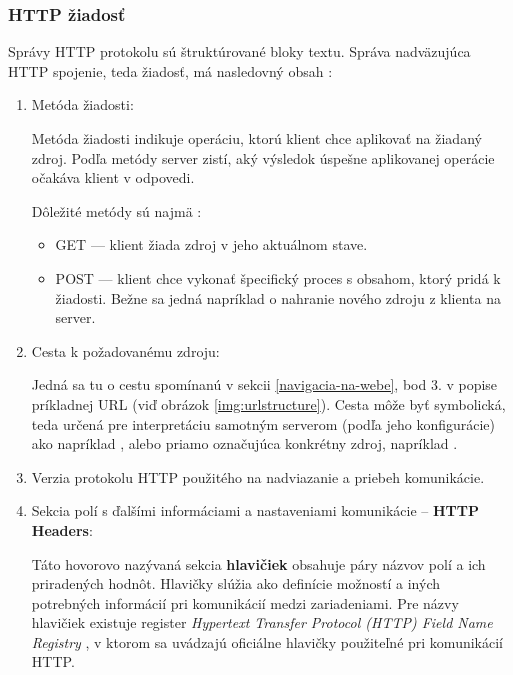 \subsubsection{HTTP žiadosť}

Správy HTTP protokolu sú štruktúrované bloky textu.
Správa nadväzujúca HTTP spojenie, teda žiadosť, má nasledovný obsah \cite{rfc7230, mdn-docs-http-overview}:
\begin{enumerate}
    \item Metóda žiadosti:

    Metóda žiadosti indikuje operáciu, ktorú klient chce aplikovať na žiadaný zdroj.
    Podľa metódy server zistí, aký výsledok úspešne aplikovanej operácie očakáva klient v odpovedi.

    Dôležité metódy sú najmä \cite{rfc9110}:
    \begin{itemize}
        \item GET --- klient žiada zdroj v jeho aktuálnom stave. 
        \item POST --- klient chce vykonať špecifický proces s obsahom, ktorý pridá k žiadosti. 
        Bežne sa jedná napríklad o nahranie nového zdroju z klienta na server.
    \end{itemize}
    
    \item Cesta k požadovanému zdroju:

    Jedná sa tu o cestu spomínanú v sekcii \ref{navigacia-na-webe}, bod 3. v popise príkladnej URL (viď obrázok \ref{img:urlstructure}).
    Cesta môže byť symbolická, teda určená pre interpretáciu samotným serverom (podľa jeho konfigurácie) ako napríklad , alebo priamo označujúca konkrétny zdroj, napríklad .
 
    \item Verzia protokolu HTTP použitého na nadviazanie a priebeh komunikácie.
    
    \item Sekcia polí s ďalšími informáciami a nastaveniami komunikácie -- \textbf{HTTP Headers}:
    
    Táto hovorovo nazývaná sekcia \textbf{hlavičiek} obsahuje páry názvov polí a ich priradených hodnôt. 
    Hlavičky slúžia ako definície možností a iných potrebných informácií pri komunikácií medzi zariadeniami.
    Pre názvy hlavičiek existuje register \textit{Hypertext Transfer Protocol (HTTP) Field Name Registry} \cite{rfc9110},
    v ktorom sa uvádzajú oficiálne hlavičky použiteľné pri komunikácií HTTP. 


\end{enumerate}
